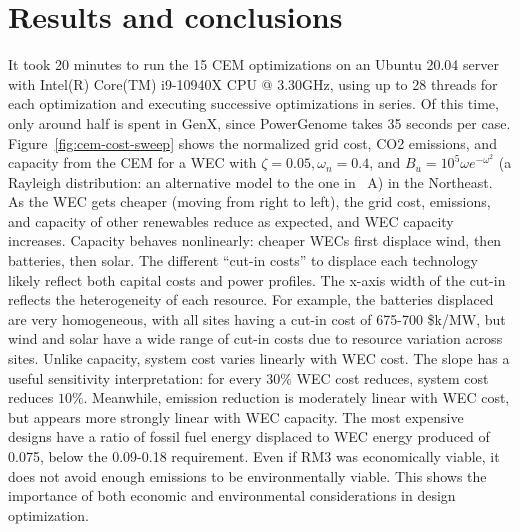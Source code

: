 \documentclass[10pt,twoside]{article}
\begin{document}
\section{Results and conclusions}
It took 20 minutes to run the 15 CEM optimizations on an Ubuntu 20.04 server with Intel(R) Core(TM) i9-10940X CPU @ 3.30GHz, using up to 28 threads for each optimization and executing successive optimizations in series. Of this time, only around half is spent in GenX, since PowerGenome takes 35 seconds per case. %
Figure~\ref{fig:cem-cost-sweep} shows the normalized grid cost, CO2 emissions, and capacity from the CEM for a WEC with $\zeta=0.05, \omega_n=0.4$, and $B_{u}=10^5\omega e^{-\omega^2}$ (a Rayleigh distribution: an alternative model to the one in \appendixname~A) in the Northeast.
As the WEC gets cheaper (moving from right to left), %
the grid cost, emissions, and capacity of other renewables reduce as expected, and WEC capacity increases.
Capacity behaves nonlinearly: cheaper WECs first displace wind, then batteries, then solar.
The different ``cut-in costs'' to displace each technology likely reflect both capital costs and power profiles.
The x-axis width of the cut-in reflects the heterogeneity of each resource. For example, the batteries displaced are very homogeneous, with all sites having a cut-in cost of 675-700 \$k/MW, but wind and solar have a wide range of cut-in costs due to resource variation across sites.
Unlike capacity, system cost varies linearly with WEC cost.
The slope has a useful sensitivity interpretation: for every $30\%$ WEC cost reduces, system cost reduces $10\%$.
Meanwhile, emission reduction is moderately linear with WEC cost, but appears more strongly linear with WEC capacity.
The most expensive designs have a ratio of fossil fuel energy displaced to WEC energy produced of 0.075, below the 0.09-0.18 requirement.
Even if RM3 was economically viable, it does not avoid enough emissions to be environmentally viable. This shows the importance of both economic and environmental considerations in design optimization.
\end{document}
